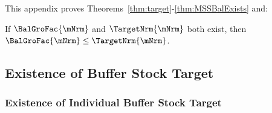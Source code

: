 \documentclass[\econtexRoot/BufferStockTheory]{subfiles}
\begin{document}
This appendix proves Theorems~\ref{thm:target}-\ref{thm:MSSBalExists} and:
\compilingassubfile{\setcounter{theorem}{1}}

  \begin{lemma}
  If $\BalGroFac{\mNrm}$ and $\TargetNrm{\mNrm}$ both exist, then $\BalGroFac{\mNrm} \leq \TargetNrm{\mNrm}$.
  \end{lemma}

  \begin{comment}
  \begin{lemma}\labelsafe{lemma:orderingPartTwo}
  If $\BalGroFac{\mNrm}$ and $\BalGroRte{\mNrm}$ both exist, then $\BalGroFac{\mNrm} \leq \BalGroRte{\mNrm}$.
  \end{lemma}
\end{comment}

\subsection{Existence of Buffer Stock Target}

\subsubsection{Existence of Individual Buffer Stock Target}\label{subsubsec:AppxIndividTarget} %
%
  
\end{document}
